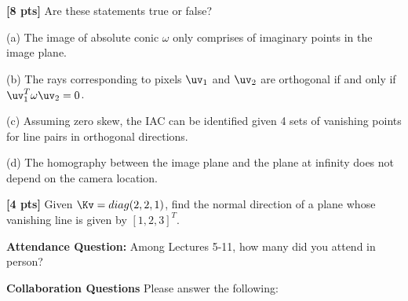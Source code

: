 \documentclass[11pt,addpoints,answers]{exam}
\numberwithin{equation}{section} %
\numberwithin{figure}{section} %
\numberwithin{table}{section} %
\begin{document}
\begin{questions}
\begin{tcolorbox}[fit,height=10cm, width=\textwidth, blank, borderline={0.5pt}{-2pt},halign=left, valign=center, nobeforeafter]


\end{tcolorbox}

\question \textbf{[8 pts]} Are these statements true or false?

(a) The image of absolute conic $\omega$ only comprises of imaginary points in the image plane.

(b) The rays corresponding to pixels $\uv_1$ and $\uv_2$ are orthogonal if and only if $\uv_1^T \omega \uv_2 = 0$.

(c) Assuming zero skew, the IAC can be identified given 4 sets of vanishing points for line pairs in orthogonal directions.

(d) The homography between the image plane and the plane at infinity does not depend on the camera location.

\begin{tcolorbox}[fit,height=18cm, width=\textwidth, blank, borderline={0.5pt}{-2pt},halign=left, valign=center, nobeforeafter]


\end{tcolorbox}

\question \textbf{[4 pts]} Given $\Kv=diag(2,2,1)$, find the normal direction of a plane whose vanishing line is given by $[1,2,3]^T$.

\begin{tcolorbox}[fit,height=16cm, width=\textwidth, blank, borderline={0.5pt}{-2pt},halign=left, valign=center, nobeforeafter]


\end{tcolorbox}

\end{questions}

\clearpage
\textbf{Attendance Question:} Among Lectures 5-11, how many did you attend in person?

\begin{tcolorbox}[fit,height=1cm,blank, borderline={1pt}{-2pt},nobeforeafter]
\end{tcolorbox}



\textbf{Collaboration Questions} Please answer the following:
\end{document}
